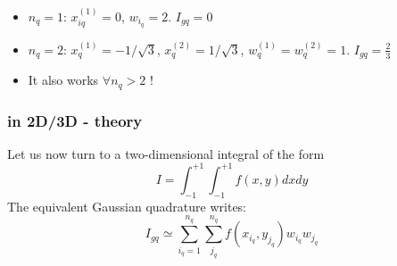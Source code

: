 \begin{itemize}
\item $n_q=1$: $x_{iq}^{(1)}=0$, $w_{i_q}=2$. $I_{gq}=0$
\item $n_q=2$: $x_{q}^{(1)}=-1/\sqrt{3}$, $x_{q}^{(2)}=1/\sqrt{3}$, $w_{q}^{(1)}=w_{q}^{(2)}=1$. $I_{gq}=\frac{2}{3}$
\item It also works $\forall n_q>2$ !
\end{itemize}

\subsubsection{in 2D/3D - theory}


Let us now turn to a two-dimensional integral of the form
\[
I=\int_{-1}^{+1} \int_{-1}^{+1} f(x,y) dx dy
\]
The equivalent Gaussian quadrature writes:
\[
I_{gq}
\simeq \sum_{i_q=1}^{n_q}\sum_{j_q}^{n_q} f(x_{i_q},y_{j_q}) w_{i_q} w_{j_q}
\]



